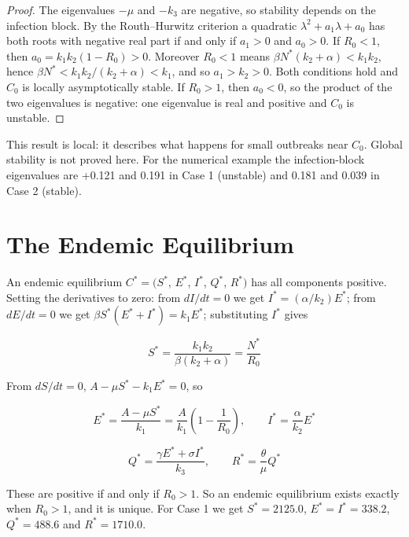 \documentclass[12pt,a4paper]{article}
\theoremstyle{definition}
\begin{document}
\begin{proof}
The eigenvalues $-\mu$ and $-k_{3}$ are negative, so stability depends on the infection block. By the Routh–Hurwitz criterion a quadratic $\lambda ^{2} + a_{1}\lambda + a_{0}$ has both roots with negative real part if and only if $a_{1} > 0$ and $a_{0} > 0$. If $R_{0} < 1$, then $a_{0} = k_{1}k_{2}(1 - R_{0}) > 0$. Moreover $R_{0} < 1$ means $\beta N^*(k_{2} + \alpha ) < k_{1}k_{2}$, hence $\beta N^* < k_{1}k_{2}/(k_{2} + \alpha ) < k_{1}$, and so $a_{1} > k_{2} > 0$. Both conditions hold and $C_{0}$ is locally asymptotically stable. If $R_{0} > 1$, then $a_{0} < 0$, so the product of the two eigenvalues is negative: one eigenvalue is real and positive and $C_{0}$ is unstable.
\end{proof}

This result is local: it describes what happens for small outbreaks near $C_{0}$. Global stability is not proved here. For the numerical example the infection-block eigenvalues are +0.121 and \textminus{}0.191 in Case 1 (unstable) and \textminus{}0.181 and \textminus{}0.039 in Case 2 (stable).


\section{The Endemic Equilibrium}

An endemic equilibrium $C^* = (S^*$, $E^*$, $I^*$, $Q^*$, $R^*)$ has all components positive. Setting the derivatives to zero: from $dI/dt = 0$ we get $I^* = (\alpha /k_{2})E^*$; from $dE/dt = 0$ we get $\beta S^*(E^* + I^*) = k_{1}E^*$; substituting $I^*$ gives


\begin{equation}
S^* = \frac{k_1k_2}{\beta(k_2+\alpha)} = \frac{N^*}{R_0}
\end{equation}

From $dS/dt = 0$, $A - \mu S^* - k_{1}E^* = 0$, so


\begin{equation}
E^* = \frac{A-\mu S^*}{k_1} = \frac{A}{k_1}\left(1-\frac{1}{R_0}\right),\qquad I^* = \frac{\alpha}{k_2}E^*
\end{equation}

\begin{equation}
Q^* = \frac{\gamma E^*+\sigma I^*}{k_3},\qquad R^* = \frac{\theta}{\mu}Q^*
\end{equation}

These are positive if and only if $R_{0} > 1$. So an endemic equilibrium exists exactly when $R_{0} > 1$, and it is unique. For Case 1 we get $S^* = 2125.0$, $E^* = I^* = 338.2$, $Q^* = 488.6$ and $R^* = 1710.0$.
\end{document}

